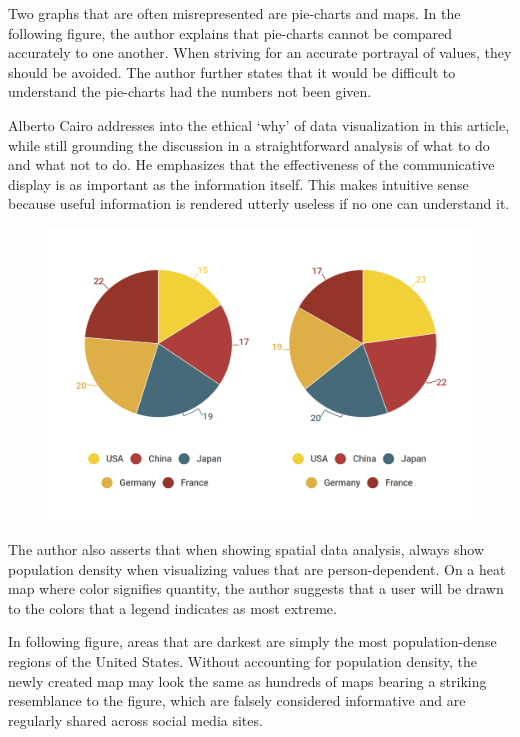 \documentclass[]{book}
\theoremstyle{definition}
\theoremstyle{definition}
\theoremstyle{definition}
\theoremstyle{remark}
\begin{document}
Two graphs that are often misrepresented are pie-charts and maps. In the
following figure, the author explains that pie-charts cannot be compared
accurately to one another. When striving for an accurate portrayal of
values, they should be avoided. The author further states that it would
be difficult to understand the pie-charts had the numbers not been
given.

Alberto Cairo addresses into the ethical `why' of data visualization in
this article, while still grounding the discussion in a straightforward
analysis of what to do and what not to do. He emphasizes that the
effectiveness of the communicative display is as important as the
information itself. This makes intuitive sense because useful
information is rendered utterly useless if no one can understand it.

\begin{figure}
\centering
\includegraphics{images/PieCharts.png}
\caption{}
\end{figure}

The author also asserts that when showing spatial data analysis, always
show population density when visualizing values that are
person-dependent. On a heat map where color signifies quantity, the
author suggests that a user will be drawn to the colors that a legend
indicates as most extreme.

In following figure, areas that are darkest are simply the most
population-dense regions of the United States. Without accounting for
population density, the newly created map may look the same as hundreds
of maps bearing a striking resemblance to the figure, which are falsely
considered informative and are regularly shared across social media
sites.
\end{document}
